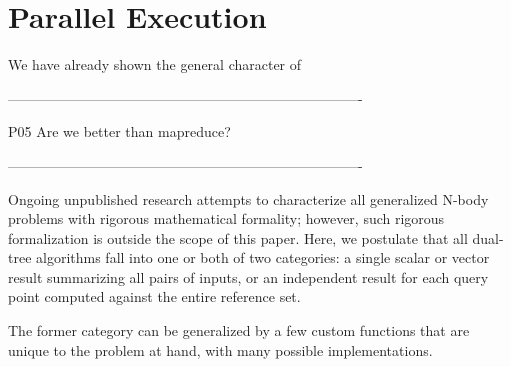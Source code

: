 \documentclass[times, 10pt,twocolumn]{article}
\begin{document}
\section{Parallel Execution}

We have already shown the general character of 



----------------------------------------------------------------------------

P05 Are we better than mapreduce?

----------------------------------------------------------------------------




Ongoing unpublished research attempts to
characterize all generalized N-body problems with rigorous mathematical
formality; however, such rigorous formalization is outside the scope of this
paper.  Here, we postulate that all dual-tree algorithms fall into one or
both of two categories: a single scalar or vector result summarizing all
pairs of inputs, or an independent result for each query point computed
against the entire reference set.

The former category can be generalized by a few custom functions that are
unique to the problem at hand, with many possible implementations.







\nocite{ex1,ex2}


\end{document}
